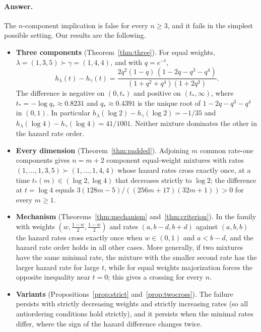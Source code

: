 \documentclass[10pt]{article}
\theoremstyle{plain}
\theoremstyle{definition}
\theoremstyle{remark}
\begin{document}
\paragraph{Answer.} The $n$-component implication is false for every $n\ge 3$, and it fails in the simplest possible setting. Our results are the following.

\begin{itemize}
\item[(a)] \textbf{Three components} (Theorem~\ref{thm:three}). For equal weights, $\lambda=(1,3,5)\succ\gamma=(1,4,4)$, and with $q=e^{-t}$,
\[
h_\lambda(t)-h_\gamma(t)=\frac{2q^2(1-q)\,(1-2q-q^3-q^4)}{(1+q^2+q^4)(1+2q^3)} .
\]
The difference is negative on $(0,t_*)$ and positive on $(t_*,\infty)$, where $t_*=-\log q_*\approx 0.8231$ and $q_*\approx 0.4391$ is the unique root of $1-2q-q^3-q^4$ in $(0,1)$. In particular $h_\lambda(\log 2)-h_\gamma(\log 2)=-1/35$ and $h_\lambda(\log 4)-h_\gamma(\log 4)=41/1001$. Neither mixture dominates the other in the hazard rate order.
\item[(b)] \textbf{Every dimension} (Theorem~\ref{thm:padded}). Adjoining $m$ common rate-one components gives $n=m+2$ component equal-weight mixtures with rates $(1,\dots,1,3,5)\succ(1,\dots,1,4,4)$ whose hazard rates cross exactly once, at a time $t_*(m)\in(\log 2,\log 4)$ that decreases strictly to $\log 2$; the difference at $t=\log 4$ equals $3(128m-5)/((256m+17)(32m+1))>0$ for every $m\ge 1$.
\item[(c)] \textbf{Mechanism} (Theorems~\ref{thm:mechanism} and~\ref{thm:criterion}). In the family with weights $(w,\tfrac{1-w}{2},\tfrac{1-w}{2})$ and rates $(a,b-d,b+d)$ against $(a,b,b)$ the hazard rates cross exactly once when $w\in(0,1)$ and $a<b-d$, and the hazard rate order holds in all other cases. More generally, if two mixtures have the same minimal rate, the mixture with the smaller second rate has the larger hazard rate for large $t$, while for equal weights majorization forces the opposite inequality near $t=0$; this gives a crossing for every $n$.
\item[(d)] \textbf{Variants} (Propositions~\ref{prop:strict} and~\ref{prop:twocross}). The failure persists with strictly decreasing weights and strictly increasing rates (so all antiordering conditions hold strictly), and it persists when the minimal rates differ, where the sign of the hazard difference changes twice.

\end{itemize}
\end{document}
